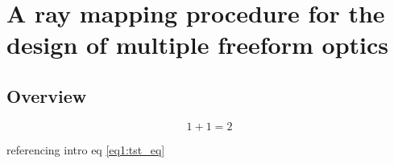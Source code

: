 \chapter{A ray mapping procedure for the design of multiple freeform optics}
\label{ch:core}

\section{Overview}
\begin{equation}
\label{eq3:tst_eq}
1+1=2
\end{equation}

referencing intro eq \eqref{eq1:tst_eq}